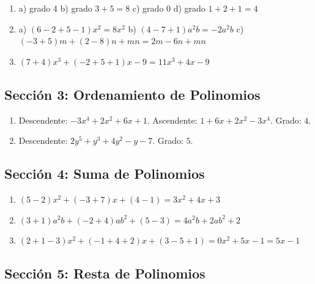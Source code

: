 \documentclass[12pt, letterpaper]{article}
\begin{document}
  \begin{enumerate}[leftmargin=*, label=\textbf{\arabic*.}]
    \item a) grado $4$ \quad b) grado $3 + 5 = 8$ \quad c) grado $0$ \quad d) grado $1 + 2 + 1 = 4$

    \item a) $(6 - 2 + 5 - 1)x^2 = 8x^2$ \quad
          b) $(4 - 7 + 1)a^2b = -2a^2b$ \quad
          c) $(-3 + 5)m + (2 - 8)n + mn = 2m - 6n + mn$

    \item $(7 + 4)x^3 + (-2 + 5 + 1)x - 9 = 11x^3 + 4x - 9$
  \end{enumerate}

  \newpage

  \subsection*{Sección 3: Ordenamiento de Polinomios}

  \begin{enumerate}[leftmargin=*, label=\textbf{\arabic*.}]
    \item Descendente: $-3x^4 + 2x^2 + 6x + 1$. \quad Ascendente: $1 + 6x + 2x^2 - 3x^4$. \quad Grado: $4$.

    \item Descendente: $2y^5 + y^3 + 4y^2 - y - 7$. \quad Grado: $5$.
  \end{enumerate}

  \newpage

  \subsection*{Sección 4: Suma de Polinomios}

  \begin{enumerate}[leftmargin=*, label=\textbf{\arabic*.}]
    \item $(5 - 2)x^2 + (-3 + 7)x + (4 - 1) = 3x^2 + 4x + 3$

    \item $(3 + 1)a^2b + (-2 + 4)ab^2 + (5 - 3) = 4a^2b + 2ab^2 + 2$

    \item $(2 + 1 - 3)x^2 + (-1 + 4 + 2)x + (3 - 5 + 1) = 0x^2 + 5x - 1 = 5x - 1$
  \end{enumerate}

  \newpage

  \subsection*{Sección 5: Resta de Polinomios}
\end{document}
